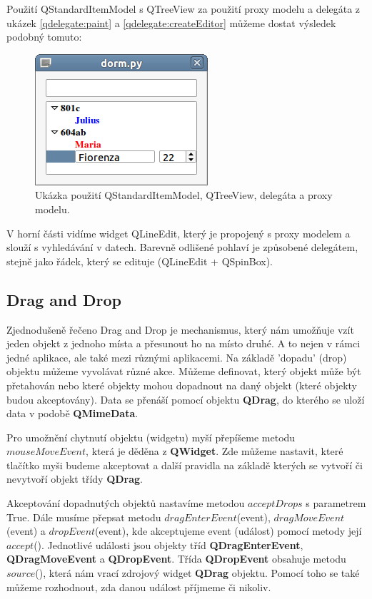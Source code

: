 Použití QStandardItemModel s QTreeView za použití proxy modelu a delegáta z ukázek \ref{qdelegate:paint} a \ref{qdelegate:createEditor} můžeme dostat výsledek podobný tomuto:

\begin{figure}[h]
	\centering
	\includegraphics[scale=0.7]{pictures/qt/dorm}
	\caption{Ukázka použití QStandardItemModel, QTreeView, delegáta a proxy modelu.}
	\label{pic:delegate}
\end{figure} 

\noindent
V horní části vidíme widget QLineEdit, který je propojený s proxy modelem a slouží s vyhledávání v datech. Barevně odlišené pohlaví je způsobené delegátem, stejně jako řádek, který se edituje (QLineEdit + QSpinBox). %

\subsection{Drag and Drop}
Zjednodušeně řečeno Drag and Drop je mechanismus, který nám umožňuje vzít jeden objekt z jednoho místa a přesunout ho na místo druhé. A to nejen v rámci jedné aplikace, ale také mezi různými aplikacemi. Na základě 'dopadu' (drop) objektu můžeme vyvolávat různé akce. Můžeme definovat, který objekt může být přetahován nebo které objekty mohou dopadnout na daný objekt (které objekty budou akceptovány). Data se přenáší pomocí objektu \textbf{QDrag}, do kterého se uloží data v podobě \textbf{QMimeData}.

Pro umožnění chytnutí objektu (widgetu) myší přepíšeme metodu $mouseMoveEvent$, která je děděna z \textbf{QWidget}. Zde můžeme nastavit, které tlačítko myši budeme akceptovat a další pravidla na základě kterých se vytvoří či nevytvoří objekt třídy \textbf{QDrag}. 

Akceptování dopadnutých objektů nastavíme metodou $acceptDrops$ s parametrem True. Dále musíme přepsat metodu $dragEnterEvent$(event), $dragMoveEvent$(event) a $dropEvent$(event), kde akceptujeme event (událost) pomocí metody její $accept$(). Jednotlivé události jsou objekty tříd \textbf{QDragEnterEvent}, \textbf{QDragMoveEvent} a \textbf{QDropEvent}. Třída \textbf{QDropEvent} obsahuje metodu $source$(), která nám vrací zdrojový widget \textbf{QDrag} objektu. Pomocí toho se také můžeme rozhodnout, zda danou událost příjmeme či nikoliv.

